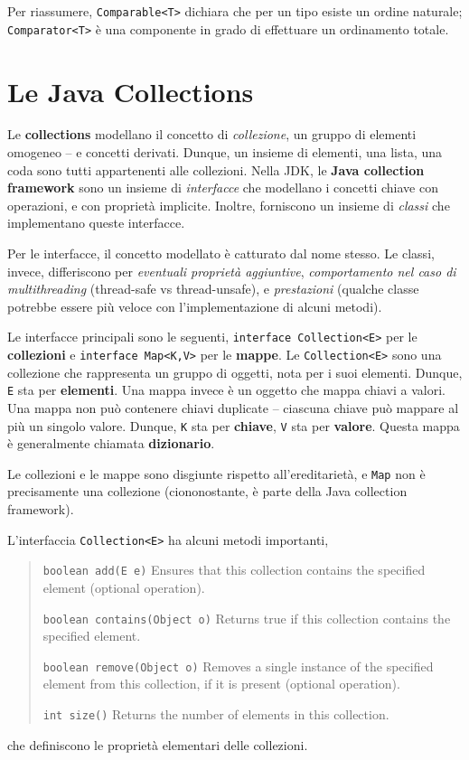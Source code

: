 \documentclass[\fontsizeclass,twocolumn]{\classname}
\theoremstyle{definition}
\theoremstyle{definition}
\begin{document}
Per riassumere, \texttt{Comparable<T>} dichiara che per un tipo esiste un
ordine naturale; \texttt{Comparator<T>} è una componente in grado di effettuare
un ordinamento totale.


\chapter{Le Java Collections}

Le \textbf{collections} modellano il concetto di \emph{collezione}, un gruppo
di elementi omogeneo -- e concetti derivati. Dunque, un insieme di elementi,
una lista, una coda sono tutti appartenenti alle collezioni. Nella JDK, le
\textbf{Java collection framework} sono un insieme di \emph{interfacce} che
modellano i concetti chiave con operazioni, e con proprietà implicite. Inoltre,
forniscono un insieme di \emph{classi} che implementano queste interfacce.

Per le interfacce, il concetto modellato è catturato dal nome stesso. Le
classi, invece, differiscono per \emph{eventuali proprietà aggiuntive},
\emph{comportamento nel caso di multithreading} (thread\--safe vs
thread\--unsafe), e \emph{prestazioni} (qualche classe potrebbe essere più
veloce con l'implementazione di alcuni metodi).

Le interfacce principali sono le seguenti, \texttt{interface Collection<E>} per
le \textbf{collezioni} e \texttt{interface Map<K,V>} per le \textbf{mappe}. Le
\texttt{Collection<E>} sono una collezione che rappresenta un gruppo di
oggetti, nota per i suoi elementi. Dunque, \texttt{E} sta per
\textbf{elementi}. Una mappa invece è un oggetto che mappa chiavi a valori. Una
mappa non può contenere chiavi duplicate -- ciascuna chiave può mappare al più
un singolo valore. Dunque, \texttt{K} sta per \textbf{chiave}, \texttt{V} sta
per \textbf{valore}. Questa mappa è generalmente chiamata \textbf{dizionario}.

Le collezioni e le mappe sono disgiunte rispetto all'ereditarietà, e
\texttt{Map} non è precisamente una collezione (ciononostante, è parte della
Java collection framework).

L'interfaccia \texttt{Collection<E>} ha alcuni metodi importanti,
\begin{quote}
    \footnotesize{\texttt{boolean	add(E e)}	Ensures that this collection contains the specified element (optional operation).

            \texttt{boolean	contains(Object o)}	Returns true if this collection contains the specified element.

    \texttt{boolean	remove(Object o)}	Removes a single instance of the specified element from this collection, if it is present (optional operation).

\texttt{int	size()}	Returns the number of elements in this collection.}
\end{quote}
che definiscono le proprietà elementari delle collezioni.
\end{document}
